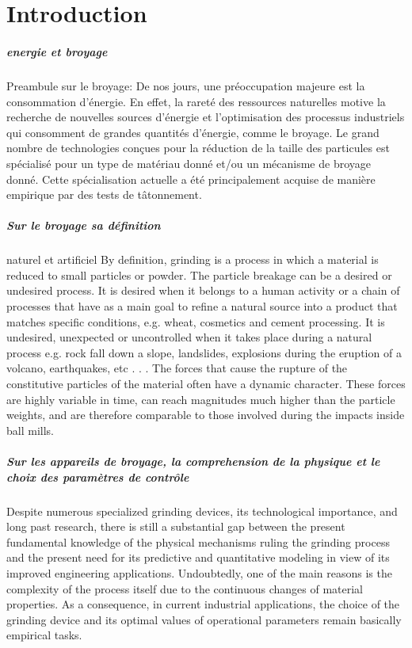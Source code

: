 
\chapter{Introduction}

\paragraph{energie et broyage}
Preambule sur le broyage: De nos jours, une préoccupation majeure est la consommation d'énergie. En effet, la rareté des ressources naturelles motive la recherche de nouvelles sources d'énergie et l'optimisation des processus industriels qui consomment de grandes quantités d'énergie, comme le broyage. Le grand nombre de technologies conçues pour la réduction de la taille des particules est spécialisé pour un type de matériau donné et/ou un mécanisme de broyage donné. Cette spécialisation actuelle a été principalement acquise de manière empirique par des tests de tâtonnement.

\paragraph{Sur le broyage sa définition} naturel et artificiel
By definition, grinding is a process in which a material is reduced to small particles or powder. The particle breakage can be a desired or undesired process. It is desired when it belongs to a human activity or a chain of processes that have as a main goal to refine a natural source into a product that matches specific conditions, e.g. wheat, cosmetics and cement processing. It is undesired, unexpected or uncontrolled when it takes place during a natural process e.g. rock fall down a slope, landslides, explosions during the eruption of a volcano, earthquakes, etc . . . The forces that cause the rupture of the constitutive particles of the material often have a dynamic character. These forces are highly variable in time, can reach magnitudes much higher than the particle weights, and are therefore comparable to those involved during the impacts inside ball mills.

\paragraph{Sur les appareils de broyage, la comprehension de la physique et le choix des paramètres de contrôle}
Despite numerous specialized grinding devices, its technological importance, and long past research, there is still a substantial gap between the present fundamental knowledge of the physical mechanisms ruling the grinding process and the present need for its predictive and quantitative modeling in view of its improved engineering applications. Undoubtedly, one of the main reasons is the complexity of the process itself due to the continuous changes of material properties. As a consequence, in current industrial applications, the choice of the grinding device and its optimal values of operational parameters remain basically empirical tasks.

